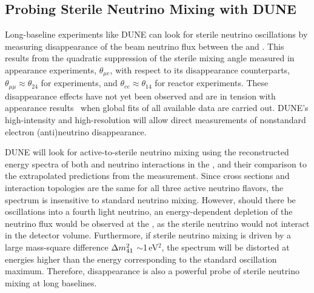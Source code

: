 \subsection{Probing Sterile Neutrino Mixing with DUNE}

Long-baseline experiments like DUNE can look for sterile neutrino oscillations by measuring disappearance of the beam neutrino flux between the  and . This results from the quadratic suppression of the sterile mixing angle measured in appearance experiments, $\theta_{\mu e}$, with respect to its disappearance counterparts, $\theta_{\mu\mu}\approx\theta_{24}$ for  experiments, and $\theta_{ee}\approx\theta_{14}$ for reactor experiments. These disappearance effects have not yet been observed and are in tension with appearance results~\cite{ref:tension} when global fits of all available data are carried out. DUNE's high-intensity and high-resolution  will allow direct measurements of nonstandard electron (anti)neutrino disappearance. 

DUNE will look for active-to-sterile neutrino mixing using the reconstructed energy spectra of both  and   neutrino interactions  in the , and their comparison to the extrapolated predictions from the  measurement. Since  cross sections and interaction topologies are the same for all three active neutrino flavors, the  spectrum is insensitive to standard neutrino mixing. However, should there be oscillations into a fourth light neutrino, an energy-dependent depletion of the neutrino flux would be observed at the , as the sterile neutrino would not interact in the detector volume. Furthermore, if sterile neutrino mixing is driven by a large mass-square difference $\Delta m^2_{\rm{41}}$ $\sim$1\,eV$^{2}$, the  spectrum will be distorted at energies higher than the energy corresponding to the standard oscillation maximum. Therefore,  disappearance is also a powerful probe of sterile neutrino mixing at long baselines. 

